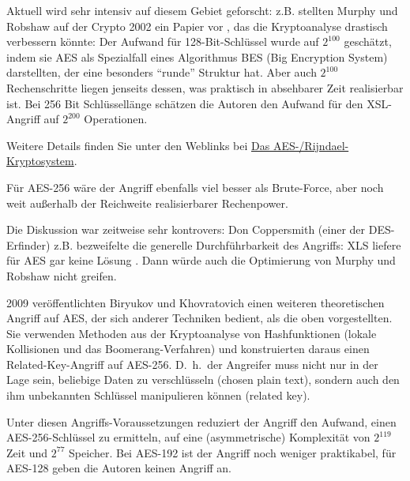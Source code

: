 \begin{refsegment}
Aktuell wird sehr intensiv auf diesem Gebiet geforscht: z.B. stellten
Murphy und Robshaw auf der Crypto 2002 ein Papier vor \cite{Robshaw2002a},
das die Kryptoanalyse drastisch verbessern könnte: Der Aufwand für
128-Bit-Schlüssel wurde auf $2^{100}$ geschätzt, indem sie AES als
Spezialfall eines Algorithmus BES (Big Encryption System) darstellten,
der eine besonders "`runde"' Struktur hat. Aber auch $2^{100}$
Rechenschritte liegen jenseits dessen, was praktisch in absehbarer Zeit
realisierbar ist. Bei 256 Bit Schlüssellänge schätzen die Autoren
den Aufwand für den XSL-Angriff auf $2^{200}$ Operationen.

Weitere Details finden Sie unter den Weblinks bei
\hyperlink{CM_HT_Weblink_Rijndael-Cryptosystem}{\glqq Das AES-/Rijndael-Kryptosystem\grqq}.


Für AES-256 wäre der Angriff ebenfalls viel besser als
Brute-Force, aber noch weit außerhalb der
Reichweite realisierbarer Rechenpower.

\begin{sloppypar}
Die Diskussion war zeitweise sehr kontrovers: Don Coppersmith (einer der
DES-Erfinder) z.B. bezweifelte die generelle Durchführbarkeit des Angriffs:
XLS liefere für AES gar keine Lösung \cite{Coppersmith2002}. Dann würde
auch die Optimierung von Murphy und Robshaw \cite{Robshaw2002b} nicht
greifen.
\end{sloppypar}

2009 veröffentlichten Biryukov und Khovratovich \cite{Biryukov2009} einen
weiteren theoretischen Angriff auf AES, der sich anderer Techniken bedient, als
die oben vorgestellten. Sie verwenden Methoden aus der Kryptoanalyse von
Hashfunktionen (lokale Kollisionen und das Boomerang-Verfahren) und
konstruierten daraus einen Related-Key-Angriff auf AES-256. D.~h.\ der Angreifer
muss nicht nur in der Lage sein, beliebige Daten zu verschlüsseln (chosen plain
text), sondern auch den ihm unbekannten Schlüssel manipulieren können (related
key).

Unter diesen Angriffs-Voraussetzungen reduziert der Angriff den Aufwand, einen
AES-256-Schlüssel zu ermitteln, auf eine (asymmetrische) Komplexität von
$2^{119}$ Zeit und $2^{77}$ Speicher. Bei AES-192 ist der Angriff noch weniger
praktikabel, für AES-128 geben die Autoren keinen Angriff an.



\end{refsegment}
